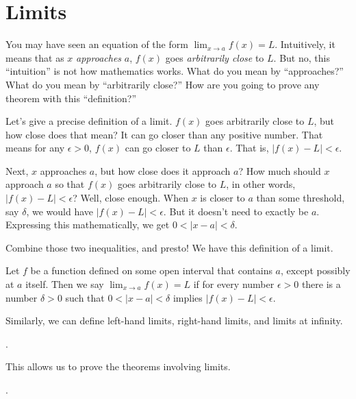 


    \section{Limits}
        You may have seen an equation of the form $\lim_{x \to a}f(x) = L$. Intuitively, it means that as $x$ \textit{approaches} $a$, $f(x)$ goes \textit{arbitrarily close} to $L$. But no, this ``intuition'' is not how mathematics works. What do you mean by ``approaches?'' What do you mean by ``arbitrarily close?'' How are you going to prove any theorem with this ``definition?''
    
        Let's give a precise definition of a limit. $f(x)$ goes arbitrarily close to $L$, but how close does that mean? It can go closer than any positive number. That means for any $\epsilon > 0$, $f(x)$ can go closer to $L$ than $\epsilon$. That is, $|f(x) - L| < \epsilon$.
    
        Next, $x$ approaches $a$, but how close does it approach $a$? How much should $x$ approach $a$ so that $f(x)$ goes arbitrarily close to $L$, in other words, $|f(x) - L| < \epsilon$? Well, close enough. When $x$ is closer to $a$ than some threshold, say $\delta$, we would have $|f(x) - L| < \epsilon$. But it doesn't need to exactly be $a$. Expressing this mathematically, we get $0 < |x-a| < \delta$.
    
        Combine those two inequalities, and presto! We have this definition of a limit.
    
        \begin{defn}[Limit at $a$] \label{def_lim1}
            Let $f$ be a function defined on some open interval that contains $a$, except possibly at $a$ itself. Then we say $\displaystyle\lim_{x \to a} f(x) = L$ if for every number $\epsilon > 0$ there is a number $\delta > 0$ such that $0 < |x-a| < \delta$ implies $|f(x) - L | < \epsilon$.
        \end{defn}
    
        Similarly, we can define left-hand limits, right-hand limits, and limits at infinity.
    
        \begin{defn} \label{def_lim2}
            .
        \end{defn}
    
        This allows us to prove the theorems involving limits.
    
        \begin{thm} \label{def_lim_add}
            .
        \end{thm}
    
